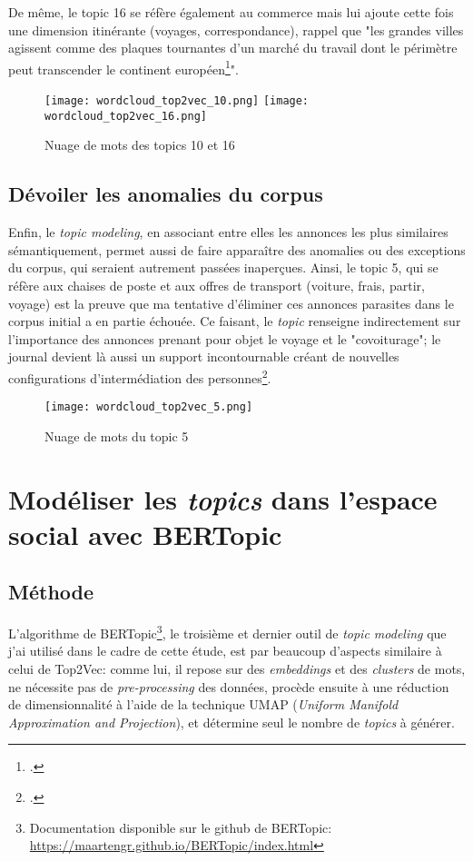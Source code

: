 De même, le topic 16 se réfère également au commerce mais lui ajoute cette fois une dimension itinérante (voyages, correspondance), rappel que "les grandes villes agissent comme des plaques tournantes d’un marché du travail dont le périmètre peut transcender le continent européen\footcites{kramplAdresserClercHuissier2017}". 

\begin{figure}[h!t]
	\centering
	\texttt{[image: wordcloud\_top2vec\_10.png]}
	\texttt{[image: wordcloud\_top2vec\_16.png]}
	\caption{Nuage de mots des topics 10 et 16}
\end{figure}

\section{Dévoiler les anomalies du corpus}

Enfin, le \textit{topic modeling}, en associant entre elles les annonces les plus similaires sémantiquement, permet aussi de faire apparaître des anomalies ou des exceptions du corpus, qui seraient autrement passées inaperçues. Ainsi, le topic 5, qui se réfère aux chaises de poste et aux offres de transport (voiture, frais, partir, voyage) est la preuve que ma tentative d'éliminer ces annonces parasites dans le corpus initial a en partie échouée. Ce faisant, le \textit{topic} renseigne indirectement sur l'importance des annonces prenant pour objet le voyage et le "covoiturage"; le journal devient là aussi un support incontournable créant de nouvelles configurations d'intermédiation des personnes\footcites{zellerAuxOriginesCovoiturage2018}. 

\begin{figure}[h!t]
	\centering
	\texttt{[image: wordcloud\_top2vec\_5.png]}
	\caption{Nuage de mots du topic 5}
\end{figure}



\chapter{Modéliser les \textit{topics} dans l'espace social avec BERTopic}

\section{Méthode}

L'algorithme de BERTopic\footnote{Documentation disponible sur le github de BERTopic: \url{https://maartengr.github.io/BERTopic/index.html}}, le troisième et dernier outil de \textit{topic modeling} que j'ai utilisé dans le cadre de cette étude, est par beaucoup d'aspects similaire à celui de Top2Vec: comme lui, il repose sur des \textit{embeddings} et des \textit{clusters} de mots, ne nécessite pas de \textit{pre-processing} des données, procède ensuite à une réduction de dimensionnalité à l'aide de la technique UMAP (\textit{Uniform Manifold Approximation and Projection}), et détermine seul le nombre de \textit{topics} à générer. 

